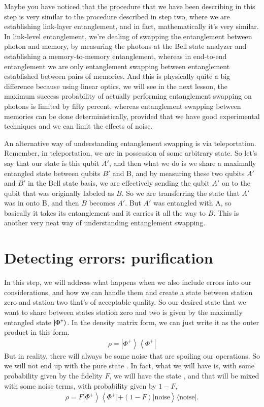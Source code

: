 Maybe you have noticed that the procedure that we have been describing in this step is very similar to the procedure described in step two, where we are establishing link-layer entanglement, and in fact, mathematically it's very similar. In link-level entanglement, we're dealing of swapping the entanglement between photon and memory, by measuring the photons at the Bell state analyzer and establishing a memory-to-memory entanglement, whereas in end-to-end entanglement we are only entanglement swapping between entanglement established between pairs of memories. And this is physically quite a big difference because using linear optics, we will see in the next lesson, the maximum success probability of actually performing entanglement swapping on photons is limited by fifty percent, whereas entanglement swapping between memories can be done deterministically, provided that we have good experimental techniques and we can limit the effects of noise.

An alternative way of understanding entanglement swapping is via teleportation. Remember, in teleportation, we are in possession of some arbitrary state. So let's say that our state is this qubit $A'$, and then what we do is we share a maximally entangled state between qubits $B'$ and B, and by measuring these two qubits $A'$ and $B'$ in the Bell state basis, we are effectively sending the qubit  $A'$ on to the qubit that was originally labeled as  $B$. So we are transferring the state that  $A'$ was in onto B, and then $B$ becomes $A'$. But $A'$ was entangled with A, so basically it takes its entanglement and it carries it all the way to $B$. This is another very neat way of understanding entanglement swapping.

\section{Detecting errors: purification}
\label{sec:purification}


In this step, we will address what happens when we also include errors into our considerations, and how we can handle them and create a state between station zero and station two that's of acceptable quality. So our desired state that we want to share between states station zero and two is given by the maximally entangled state $\left| \Phi^+ \right\rangle$. In the density matrix form, we can just write it as the outer product in this form. 
\begin{align}
    \rho=\left|\Phi^{+}\right\rangle\left\langle\Phi^{+}\right|
\end{align}
But in reality, there will always be some noise that are spoiling our operations. So we will not end up with the pure state  \ket{\Phi^+}. In fact, what we will have is, with some probability given by the fidelity $F$, we will have the state  \ket{\Phi^+}, and that will be mixed with some noise terms, with probability given by $1-F$, 
\begin{align}
    \rho=F\left|\Phi^{+}\right\rangle\left\langle\Phi^{+}|+(1-F)| \text {noise}\right\rangle\langle\text {noise}|.
\end{align}

